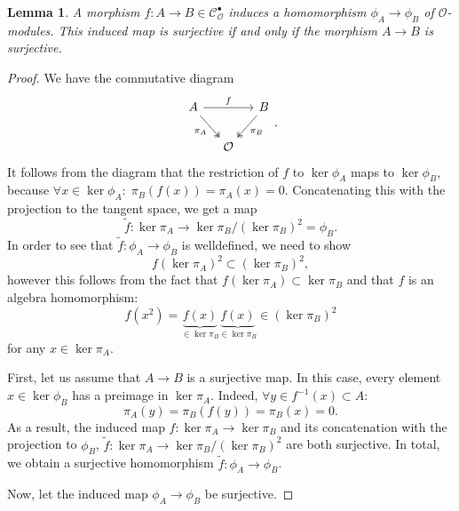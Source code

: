 \documentclass{article}
\theoremstyle{plain}%
\newtheorem{lemma}{Lemma}[section]
\theoremstyle{definition}
\theoremstyle{remark}
\newcommand{\cob}{\mathcal{C}_\mathcal{O}^\bullet}
\begin{document}
\begin{lemma}\label{lem:surjectivity_phi}
    A morphism \(f\colon A \to B \in \cob\) induces a homomorphism \(\phi_A \to \phi_B\) of \(\mathcal{O}\)-modules.
    This induced map is surjective if and only if the morphism \(A \to B\) is surjective.
\end{lemma}
\begin{proof}
    We have the commutative diagram
    \[
    \begin{tikzcd}[column sep=small]
        A \arrow[rr, "f"] \arrow [dr, "\pi_A", swap, twoheadrightarrow] & & B \arrow [dl, "\pi_B", twoheadrightarrow]\\
        & \mathcal{O} &
    \end{tikzcd}.
    \]
    It follows from the diagram that the restriction of \(f\) to \(\ker \phi_A\) maps to \(\ker \phi_B\),
    because \(\forall x \in \ker \phi_A\colon\; \pi_B(f(x)) = \pi_A(x) = 0\).
    Concatenating this with the projection to the tangent space, we get a map
    \[
        \tilde f\colon \ker \pi_A \to \ker \pi_B/(\ker \pi_B)^2 = \phi_B.
    \]
    In order to see that \(\tilde f\colon \phi_A \to \phi_B\) is welldefined, we need to show 
    \[
        f(\ker \pi_A)^2 \subset (\ker \pi_B)^2,
    \]
    however this follows from the fact that \(f(\ker \pi_A) \subset \ker \pi_B\) and that \(f\) is an algebra
    homomorphism:
    \[
        f(x^2) = \underbrace{f(x)}_{\in \ker \pi_B}\underbrace{f(x)}_{\in \ker \pi_B} \in (\ker \pi_B)^2 
    \]
    for any \(x \in \ker \pi_A\).

    First, let us assume that \(A \to B\) is a surjective map.
    In this case, every element \(x \in \ker \phi_B\) has a preimage in \(\ker \pi_A\). 
    Indeed, \(\forall y \in f^{-1}(x)\subset A\colon\)
    \[
        \pi_A(y) = \pi_B(f(y)) = \pi_B(x) = 0.
    \]
    As a result, the induced map \(f\colon \ker \pi_A \to \ker \pi_B\) and its concatenation with
    the projection to \(\phi_B\), \(\tilde f\colon \ker \pi_A \to \ker \pi_B/(\ker \pi_B)^2\) are both surjective.
    In total, we obtain a surjective homomorphism \(\tilde f\colon \phi_A \to \phi_B\).
    
    Now, let the induced map \(\phi_A \to \phi_B\) be surjective. 


\end{proof}
\end{document}
